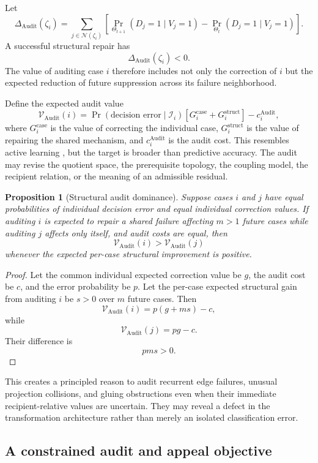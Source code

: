 \documentclass[11pt]{article}
\newtheorem{proposition}[definition]{Proposition}
\theoremstyle{definition}
\DeclareMathOperator{\Audit}{Audit}
\DeclareMathOperator{\Prob}{Pr}
\begin{document}
Let
\[
\Delta_{\Audit}(\zeta_i)
=
\sum_{j\in\mathcal{N}(\zeta_i)}
\left[
\Prob_{\Theta_{t+1}}(D_j=1\mid V_j=1)
-
\Prob_{\Theta_t}(D_j=1\mid V_j=1)
\right].
\]
A successful structural repair has
\[
\Delta_{\Audit}(\zeta_i)<0.
\]
The value of auditing case \(i\) therefore includes not only the correction of \(i\) but the expected reduction of future suppression across its failure neighborhood.

Define the expected audit value
\[
\mathcal{V}_{\Audit}(i)
=
\Prob(\text{decision error}\mid\mathscr{I}_i)
\left[
G_i^{\mathrm{case}}
+
G_i^{\mathrm{struct}}
\right]
-
c_i^{\Audit},
\]
where \(G_i^{\mathrm{case}}\) is the value of correcting the individual case, \(G_i^{\mathrm{struct}}\) is the value of repairing the shared mechanism, and \(c_i^{\Audit}\) is the audit cost. This resembles active learning \cite{settles2009}, but the target is broader than predictive accuracy. The audit may revise the quotient space, the prerequisite topology, the coupling model, the recipient relation, or the meaning of an admissible residual.

\begin{proposition}[Structural audit dominance]
Suppose cases \(i\) and \(j\) have equal probabilities of individual decision error and equal individual correction values. If auditing \(i\) is expected to repair a shared failure affecting \(m>1\) future cases while auditing \(j\) affects only itself, and audit costs are equal, then
\[
\mathcal{V}_{\Audit}(i)
>
\mathcal{V}_{\Audit}(j)
\]
whenever the expected per-case structural improvement is positive.
\end{proposition}

\begin{proof}
Let the common individual expected correction value be \(g\), the audit cost be \(c\), and the error probability be \(p\). Let the per-case expected structural gain from auditing \(i\) be \(s>0\) over \(m\) future cases. Then
\[
\mathcal{V}_{\Audit}(i)
=
p(g+ms)-c,
\]
while
\[
\mathcal{V}_{\Audit}(j)
=
pg-c.
\]
Their difference is
\[
pm s>0.
\]
\end{proof}

This creates a principled reason to audit recurrent edge failures, unusual projection collisions, and gluing obstructions even when their immediate recipient-relative values are uncertain. They may reveal a defect in the transformation architecture rather than merely an isolated classification error.

\subsection{A constrained audit and appeal objective}
\end{document}
